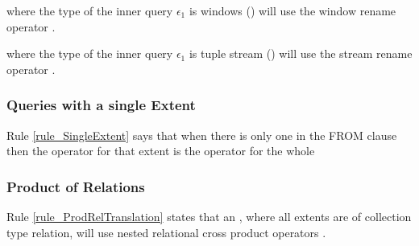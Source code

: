  where the type of the inner query $\epsilon_1$ is windows ({}) will use the window rename operator .


 where the type of the inner query $\epsilon_1$ is tuple stream ({}) will use the stream rename operator .


\subsubsection{Queries with a single Extent}

Rule \ref{rule_SingleExtent} says that when there is only one  in the FROM clause then the operator for that extent is the operator for the whole 

\subsubsection{Product of Relations}

Rule \ref{rule_ProdRelTranslation} states that an , where all
extents are of collection type relation, will use nested relational cross product operators .


